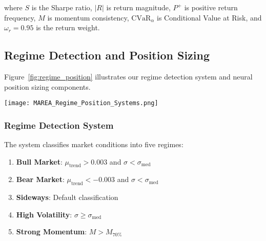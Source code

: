 \documentclass[10pt,twocolumn]{article}
\begin{document}
where $S$ is the Sharpe ratio, $|R|$ is return magnitude, $P^+$ is positive return frequency, $M$ is momentum consistency, $\text{CVaR}_{\alpha}$ is Conditional Value at Risk, and $\omega_r = 0.95$ is the return weight.

\subsection{Regime Detection and Position Sizing}

Figure~\ref{fig:regime_position} illustrates our regime detection system and neural position sizing components.

\begin{figure*}[!htb]
\centering
\vspace{0.2cm}
\texttt{[image: MAREA\_Regime\_Position\_Systems.png]}
\vspace{0.1cm}
\caption{Regime Detection and Position Sizing Systems. (1) The ReturnBoostRegimeDetector uses CNN-BiLSTM architecture to classify market conditions into five states: Bull, Bear, Sideways, High-Volatility, and Strong Momentum. (2) Regime-based model weighting adapts ensemble combination dynamically. (3) The PositionSizer neural network uses the last timestep of first 20 features for dynamic position optimization. (4) Risk management features ensure controlled leverage and drawdown protection.}
\label{fig:regime_position}
\vspace{0.2cm}
\end{figure*}

\subsubsection{Regime Detection System}

The system classifies market conditions into five regimes:

\begin{enumerate}[itemsep=1pt]
\item \textbf{Bull Market}: $\mu_{\text{trend}} > 0.003$ and $\sigma < \sigma_{\text{med}}$
\item \textbf{Bear Market}: $\mu_{\text{trend}} < -0.003$ and $\sigma < \sigma_{\text{med}}$
\item \textbf{Sideways}: Default classification
\item \textbf{High Volatility}: $\sigma \geq \sigma_{\text{med}}$
\item \textbf{Strong Momentum}: $M > M_{70\%}$
\end{enumerate}
\end{document}
